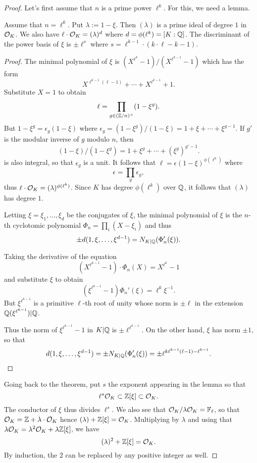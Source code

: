\begin{proof}
  Let's first assume that $n$ is a prime power $\ell^{k}$.
  For this, we need a lemma.
  \begin{lemma}
    Assume that $n = \ell^{k}$.
    Put $\lambda := 1 - \xi$.
    Then $(\lambda)$ is a prime ideal of degree $1$ in $\mathcal{O}_{K}$.
    We also have $\ell \cdot \mathcal{O}_{K} = (\lambda)^{d}$ where $d = \phi(\ell^{k}) = [K:\mathbb{Q}]$.
    The discriminant of the power basis of $\xi$ is $\pm \ell^{s}$ where $s = \ell^{k-1} \cdot (k \cdot \ell - k - 1)$.
  \end{lemma}
  \begin{proof}
    The minimal polynomial of $\xi$ is $(X^{\ell^{k}} - 1)/(X^{\ell^{k-1}}-1)$ which has the form
    \[ X^{\ell^{k-1}(\ell-1)} + \cdots + X^{\ell^{k-1}} + 1. \]
    Substitute $X = 1$ to obtain
    \[ \ell = \prod_{g \in (\mathbb{Z}/n)^{\times}} (1 - \xi^{g}). \]
    But $1 - \xi^{g} = \epsilon_{g} (1 - \xi)$ where $\epsilon_{g} = (1 - \xi^{g})/(1 - \xi) = 1 + \xi + \cdots + \xi^{g-1}$.
    If $g'$ is the modular inverse of $g$ modulo $n$, then
    \[ (1 - \xi)/(1-\xi^{g}) = 1 + \xi^{g} + \cdots + (\xi^{g})^{g'-1}. \]
    is also integral, so that $\epsilon_{g}$ is a unit.
    It follows that $\ell = \epsilon(1-\xi)^{\phi(\ell^{k})}$ where
    \[ \epsilon = \prod_{g} \epsilon_{g}, \]
    thus $\ell \cdot \mathcal{O}_{K} = (\lambda)^{\phi(\ell^{k})}$.
    Since $K$ has degree $\phi(\ell^{k})$ over $\mathbb{Q}$, it follows that $(\lambda)$ has degree $1$.

    Letting $\xi = \xi_{1},\ldots,\xi_{d}$ be the conjugates of $\xi$, the minimal polynomial of $\xi$ is the $n$-th cyclotomic polynomial $\Phi_{n} = \prod_{i}(X-\xi_{i})$ and thus
    \[ \pm d(1,\xi,\ldots,\xi^{d-1}) = N_{K|\mathbb{Q}}(\Phi_{n}'(\xi)). \]

    Taking the derivative of the equation
    \[ (X^{\ell^{k-1}}-1) \cdot \Phi_{n}(X) = X^{\ell^{k}}-1 \]
    and substitute $\xi$ to obtain
    \[ (\xi^{\ell^{k-1}}-1) \Phi_{n}'(\xi) = \ell^{k} \xi^{-1}. \]
    But $\xi^{\ell^{k-1}}$ is a primitive $\ell$-th root of unity whose norm is $\pm \ell$ in the extension $\mathbb{Q}(\xi^{\ell^{k-1}})|\mathbb{Q}$.

    Thus the norm of $\xi^{\ell^{k-1}}-1$ in $K|\mathbb{Q}$ is $\pm \ell^{\ell^{k-1}}$.
    On the other hand, $\xi$ has norm $\pm 1$, so that
    \[ d(1,\xi,\ldots,\xi^{d-1}) = \pm N_{K|\mathbb{Q}}(\Phi_{n}'(\xi)) = \pm \ell^{k\ell^{k-1}(\ell-1)-\ell^{k-1}}. \]
  \end{proof}

  Going back to the theorem, put $s$ the exponent appearing in the lemma so that
  \[ \ell^{s} \mathcal{O}_{K} \subset \mathbb{Z}[\xi] \subset \mathcal{O}_{K}. \]
  The conductor of $\xi$ thus divides $\ell^{s}$.
  We also see that $\mathcal{O}_{K}/\lambda\mathcal{O}_{K} = \mathbb{F}_{\ell}$, so that $\mathcal{O}_{K} = \mathbb{Z} + \lambda \cdot \mathcal{O}_{K}$ hence $(\lambda) + \mathbb{Z}[\xi] = \mathcal{O}_{K}$.
  Multiplying by $\lambda$ and using that $\lambda \mathcal{O}_{K} = \lambda^{2} \mathcal{O}_{K} + \lambda \mathbb{Z}[\xi]$, we have
  \[ (\lambda)^{2} + \mathbb{Z}[\xi] = \mathcal{O}_{K}. \]
  By induction, the $2$ can be replaced by any positive integer as well.


\end{proof}
